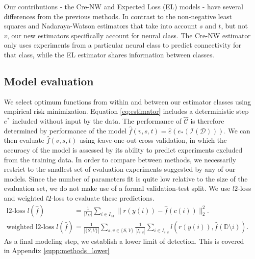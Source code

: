 Our contributions - the Cre-NW and Expected Loss (EL) models - have several differences from the previous methods.
In contrast to the \citet{Oh2014-kh} non-negative least squares and \citet{Knox2019-ot} Nadaraya-Watson estimators that take into account $s$ and $t$, but not $v$, our new estimators specifically account for neural class.
The Cre-NW estimator only uses experiments from a particular neural class to predict connectivity for that class, while the EL estimator shares information between classes.



\newpage

\subsection{Model evaluation}

We select optimum functions from within and between our estimator classes using empirical risk minimization.
Equation \ref{eq:estimator}  includes a deterministic step $e^*$ included without input by the data.
The performance of $\widehat {\mathcal C}$ is therefore determined by performance of the model $\widehat f(v,s,t) = \widehat e (e_*(\mathcal{I} (\mathcal D)))$.
We can then evaluate $\widehat f(v,s,t)$ using {\textit leave-one-out cross validation}, in which the accuracy of the model is assessed by its ability to predict experiments excluded from the training data.
In order to compare between methods, we necessarily restrict to the smallest set of evaluation experiments suggested by any of our models.
Since the number of parameters fit is quite low relative to the size of the evaluation set, we do not make use of a formal validation-test split.
We use $l2$-loss and weighted $l2$-loss to evaluate these predictions.
\begin{align*}
\text{l2-loss } l ( \hat f) &= \frac{1}{|I_M|} \sum_{i \in I_M} \| r(y(i)) - \hat f(c(i)) \|_2^2. \\
\text{weighted l2-loss } l ( \hat f) &= \frac{1}{|\{S,V\}|} \sum_{s,v \in \{S,V\}} \frac{1}{ |I_{s,v}|} \sum_{i \in I_{s,v} } l(r(y(i)), \hat f(\mathbb D \setminus i)) .
\end{align*}
As a final modeling step, we establish a lower limit of detection.
This is covered in Appendix \ref{supp:methods_lower}

